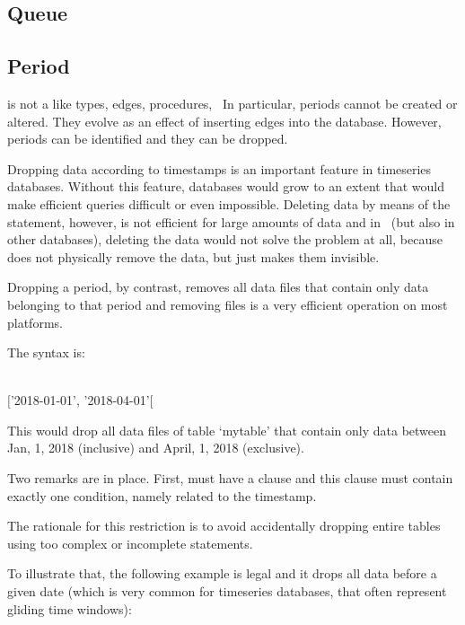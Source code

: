 \subsection{Queue}

\subsection{Period}
 is not a 
like types, edges, procedures, \etc\
In particular, periods cannot be created or altered.
They evolve as an effect of inserting edges into
the database. However, periods can be identified
and they can be dropped.

Dropping data according to timestamps is an important
feature in timeseries databases.
Without this feature, databases would grow
to an extent that would make efficient queries difficult
or even impossible. Deleting data by means of the
 statement, however, is not efficient for large
amounts of data and in \nowdb\
(but also in other databases), deleting
the data would not solve the problem at all,
because \term{delete} does not physically remove
the data, but just makes them invisible.

Dropping a period, by contrast, removes all data files 
that contain only data belonging to that period and
removing files is a very efficient
operation on most platforms.

The syntax is:

\begin{minipage}{\textwidth}
  \\
\keyword{where stamp between} $[$'2018-01-01', '2018-04-01'$[$
\end{minipage}

This would drop all data files of table `mytable'
that contain only data between Jan, 1, 2018 (inclusive) and
April, 1, 2018 (exclusive). 

Two remarks are in place. First,
 must have a  clause
and this clause must contain exactly one condition,
namely \keyword{between} related to the timestamp.

The rationale for this restriction is
to avoid accidentally dropping entire tables
using too complex or incomplete  statements.

To illustrate that, the following example 
is legal and it drops all data
before a given date (which is very common
for timeseries databases, that often represent gliding
time windows):

